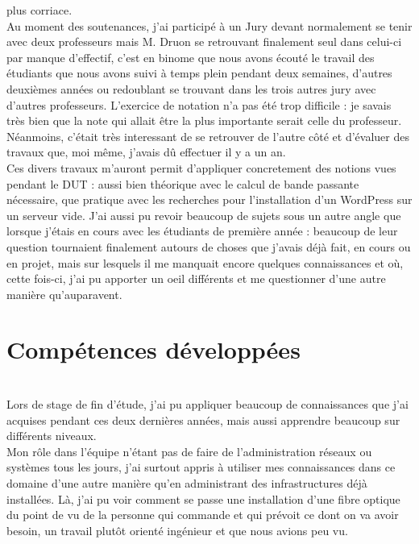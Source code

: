 \documentclass[11pt,french,a4paper]{report}
\begin{document}
plus corriace. \\
Au moment des soutenances, j'ai participé à un Jury devant normalement se tenir avec deux professeurs mais M. Druon se retrouvant finalement seul dans 
celui-ci par manque d'effectif, c'est en binome que nous avons écouté le travail des étudiants que nous avons suivi à temps plein pendant deux semaines, 
d'autres deuxièmes années ou redoublant se trouvant dans les trois autres jury avec d'autres professeurs. L'exercice de notation n'a pas été trop difficile : 
je savais très bien que la note qui allait être la plus importante serait celle du professeur. Néanmoins, c'était très interessant de se retrouver de 
l'autre côté et d'évaluer des travaux que, moi même, j'avais dû effectuer il y a un an. \\

Ces divers travaux m'auront permit d'appliquer concretement des notions vues pendant le DUT : aussi bien théorique avec le calcul de bande passante
nécessaire, que pratique avec les recherches pour l'installation d'un WordPress sur un serveur vide. J'ai aussi pu revoir beaucoup de sujets sous un autre 
angle que lorsque j'étais en cours avec les étudiants de première année : beaucoup de leur question tournaient finalement autours de choses que j'avais
déjà fait, en cours ou en projet,  mais sur lesquels il me manquait encore quelques connaissances et où, cette fois-ci, j'ai pu apporter un oeil
différents et me questionner d'une autre manière qu'auparavent. \\


    \section{Compétences développées} \\
Lors de stage de fin d'étude, j'ai pu appliquer beaucoup de connaissances que j'ai acquises pendant ces deux dernières années, mais aussi
apprendre beaucoup sur différents niveaux.\\
Mon rôle dans l'équipe n'étant pas de faire de l'administration réseaux ou systèmes tous les jours, j'ai surtout appris à utiliser
mes connaissances dans ce domaine d'une autre manière qu'en administrant des infrastructures déjà installées. Là, j'ai pu 
voir comment se passe une installation d'une fibre optique du point de vu de la personne qui commande et qui prévoit ce dont on va avoir besoin, 
un travail plutôt orienté ingénieur et que nous avions peu vu. \\
\end{document}

